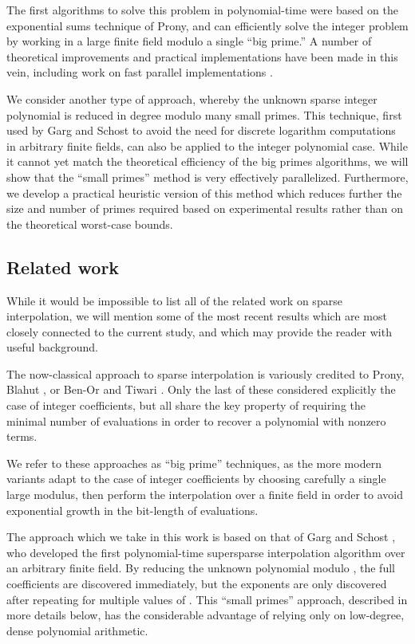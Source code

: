 \documentclass[letterpaper,10pt]{article}
\def\cite{\citep}
\begin{document}
The first algorithms to solve this problem in polynomial-time were based
on the exponential sums technique of Prony, and can efficiently solve
the integer problem by working in a large finite field modulo a single
``big prime.'' A number of theoretical improvements and practical
implementations have been made in this vein, including work on fast
parallel implementations \cite{JM10,HL15}.

We consider another type of approach, whereby the unknown sparse
integer polynomial is reduced in degree modulo many small primes. This
technique, first used by Garg and Schost to avoid the need for discrete
logarithm computations in arbitrary finite fields, can also be applied
to the integer polynomial case. While it cannot yet match the
theoretical efficiency of the big primes algorithms, we will show that the
``small primes'' method is very effectively parallelized. Furthermore, we
develop a practical heuristic version of this method which reduces
further the
size and number of primes required based on experimental results rather
than on the theoretical worst-case bounds.

\subsection{Related work}

While it would be impossible to list all of the related work on sparse
interpolation, we will mention some of the most recent results which are
most closely connected to the current study, and which may provide the
reader with useful background.

The now-classical approach to sparse interpolation is variously credited
to Prony, Blahut \cite{Bla79}, or Ben-Or and Tiwari \cite{BT88}. Only
the last of these considered explicitly the case of integer
coefficients, but all share the key property of requiring the minimal
number  of evaluations in order to recover a polynomial with 
 nonzero terms.

We refer to these approaches as ``big prime'' techniques, as the more
modern variants \cite{KY89,Kal10a} adapt to the case of integer
coefficients by choosing carefully a single large modulus, then perform
the interpolation over a finite field in order to avoid exponential
growth in the bit-length of evaluations.

The approach which we take in this work is based on that of Garg and
Schost \cite{GS09}, who developed the first polynomial-time supersparse
interpolation algorithm over an arbitrary finite field. By reducing the
unknown polynomial modulo , the full coefficients
are discovered immediately, but the exponents are only discovered after
repeating for multiple values of . This ``small primes'' approach,
described in more details below, has the considerable advantage of
relying only on low-degree, dense polynomial arithmetic.
\end{document}
